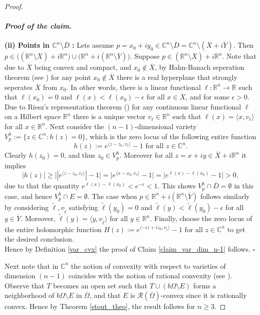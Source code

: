 \documentclass[12pt,reqno, a4paper]{amsart}
\theoremstyle{definition}
\newenvironment{claimproof}{\paragraph{\textit{Proof of the claim}.}}{\hfill$\square$}
\theoremstyle{definition}
\numberwithin{equation}{section}
\def\R{\mathbb{R}}                              %
\def\C{\mathbb{C}}                              %
\def\eps{\epsilon}
\begin{document}
\begin{proof}
\begin{claimproof}
 \noindent\textbf{(ii) Points in  $\C^n \setminus \overline{D}$ :}  Lets assume $p=x_0+iy_0\in \C^n\setminus \overline{D}=\C^n\setminus (\overline{X}+i\overline{Y}).$ Then $p\in \big((\R^n\setminus \overline{X}) +i\R^n \big)\cup \big(\R^n+i(\R^n\setminus \overline{Y})\big).$ Suppose $p\in (\R^n\setminus \overline{X}) +i\R^n$. Note that due to $\overline{X}$ being convex and compact, and $x_0\notin \overline{X}$, by Hahn-Banach seperation theorem (see \cite[Theorem 3.7]{rob}) for any point $x_0\notin \overline{X}$ there is a real hyperplane that strongly seperates $\overline{X}$ from $x_0$. In other words, there is a linear functional $\ell:\R^n \to \R$ such that $\ell(x_0)=0$ and $\ell(x)<\ell(x_0)-\epsilon$ for all $x\in \overline{X}$, and for some $\eps>0$. Due to Riesz's representation theorem (\cite[p. 351, Th 13.32]{roman}) for any continuous linear functional $\ell$ on a Hilbert space $\R^n$ there is a unique vector $v_{\ell}\in \R^n$ such that $\ell(x)=\langle x,v_{\ell}\rangle$ for all $x\in \R^n.$ Next consider the $(n-1)$-dimensional variety $V_p^h:=\{z\in \C^n: h(z)=0\}$, which is the zero locus of the following entire function $$h(z):= e^{\langle z-z_0, v_{\ell}\rangle}-1 \text{ for all } z\in \C^n.$$
  Clearly $h(z_0)=0$, and thus $z_0\in V_p^h$.  Moreover for all ${z=x+iy \in \overline{X}+i\R^n}$ it implies $$|h(z)|\geq \big||e^{\langle z-z_0, v_{\ell}\rangle}|-1\big| =\big|e^{\langle x-x_0, v_{\ell}\rangle}-1\big|= \big|e^{\ell(x)-\ell(x_0)}-1\big|>0,$$
 due to that the quantity $e^{\ell(x)-\ell(x_0)}<e^{-\eps}<1.$
  This shows $V_p^h\cap \overline{D}=\emptyset$ in this case, and hence $V_p^h\cap E=\emptyset$. The case when $p\in \R^n+i(\R^n\setminus \overline{Y})$ follows similarly by considering $\tilde{\ell}, v_{\tilde{\ell}}$ satisfying $\tilde{\ell}(y_0)=0$ and $\tilde{\ell}(y)<\tilde{\ell}(y_0)-\epsilon$ for all $y\in \overline{Y}$. Moreover, $\tilde{\ell}(y)=\langle y,v_{\tilde{\ell}}\rangle$  for all $y\in \R^n$. Finally, choose the zero locus of the entire holomorphic function $H(z):= e^{\langle -iz+iz_0,v_{\tilde{\ell}}\rangle}-1 \text{ for all } z\in \C^n$ to get the desired conclusion.\\
  
  Hence by Definition \ref{var_cvx} the proof of Claim \ref{claim_var_dim_n-1} follows.
\end{claimproof} 
 

\vspace{.5cm}
Next note that in $\C^n$ the notion of convexity with respect to varieties
of dimension $(n-1)$ coincides with the notion of rational convexity (see \cite[Page 164]{stout}). Observe that $T$ becomes an open set such that $T \cup (b\Omega \setminus E)$ forms a neighborhood of $ b\Omega\setminus E$ in $\overline{\Omega}$, and that $E$ is $\mathcal{R}(\overline{\Omega})$-convex since it is rationally convex.  Hence by Theorem \ref{stout_theo},  the result follows for $n\geq 3$.
\end{proof}
\end{document}
